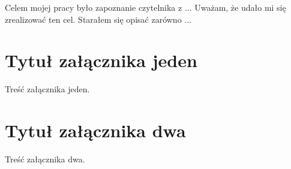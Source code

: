 \documentclass[xodstep]{wnspt}
\begin{document}






\summary
Celem mojej pracy było zapoznanie czytelnika z ... 
Uważam, że udało mi się zrealizować ten cel. Starałem się opisać zarówno ...

\appendix
\chapter{Tytuł załącznika jeden}
Treść załącznika jeden.

\chapter{Tytuł załącznika dwa}
Treść załącznika dwa.

%
%

\printbibliography[type=article, title={Bibliografia - artykuły}]
\printbibliography[type=book,title={Bibliografia - książki}]
\printbibliography[type=misc,title={Bibliografia - strony internetowe}]

\listoftables

\listoffigures

\lstlistoflistings
\end{document}
